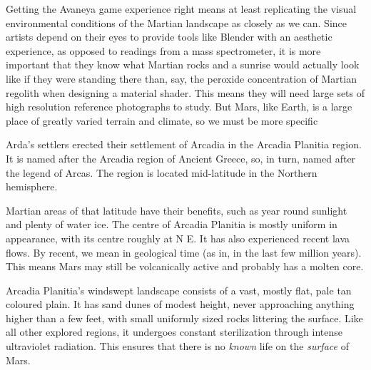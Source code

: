 


Getting the Avaneya game experience right means at least replicating the visual environmental conditions of the Martian landscape as closely as we can. Since artists depend on their eyes to provide tools like Blender with an aesthetic experience, as opposed to readings from a mass spectrometer, it is more important that they know what Martian rocks and a sunrise would actually look like if they were standing there than, say, the peroxide concentration of Martian regolith when designing a material shader. This means they will need large sets of high resolution reference photographs to study. But Mars, like Earth, is a large place of greatly varied terrain and climate, so we must be more specific

    {}

Arda's settlers erected their settlement of Arcadia in the Arcadia Planitia region. It is named after the Arcadia region of Ancient Greece, so, in turn, named after the legend of Arcas. The region is located mid-latitude in the Northern hemisphere. 

Martian areas of that latitude have their benefits, such as year round sunlight and plenty of water ice. The centre of Arcadia Planitia is mostly uniform in appearance, with its centre roughly at N E. It has also experienced recent lava flows. By recent, we mean in geological time (as in, in the last few million years). This means Mars may still be volcanically active and probably has a molten core.

Arcadia Planitia's windswept landscape consists of a vast, mostly flat, pale tan coloured plain. It has sand dunes of modest height, never approaching anything higher than a few feet, with small uniformly sized rocks littering the surface. Like all other explored regions, it undergoes constant sterilization through intense ultraviolet radiation. This ensures that there is no {\it known} life on the {\it surface} of Mars.

